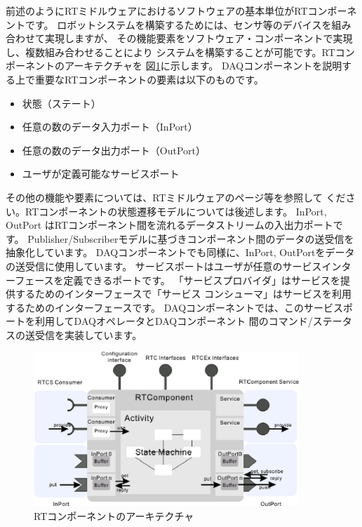 \documentclass[a4j,10pt,dvips,onecolumn,oneside,final]{jarticle}%
\begin{document}
前述のようにRTミドルウェアにおけるソフトウェアの基本単位がRTコンポーネントです。
ロボットシステムを構築するためには、センサ等のデバイスを組み合わせて実現しますが、
その機能要素をソフトウェア・コンポーネントで実現し、複数組み合わせることにより
システムを構築することが可能です。RTコンポーネントのアーキテクチャを
図\ref{RT-component.fig}に示します。
DAQコンポーネントを説明する上で重要なRTコンポーネントの要素は以下のものです。
\begin{itemize}
\item 状態（ステート）
\item 任意の数のデータ入力ポート（InPort）
\item 任意の数のデータ出力ポート（OutPort）
\item ユーザが定義可能なサービスポート
\end{itemize}
その他の機能や要素については、RTミドルウェアのページ等\cite{RTM, RTM-book}を参照して
ください。RTコンポーネントの状態遷移モデルについては後述します。
InPort,  OutPort はRTコンポーネント間を流れるデータストリームの入出力ポートです。
Publisher/Subscriberモデルに基づきコンポーネント間のデータの送受信を抽象化しています。
DAQコンポーネントでも同様に、InPort,  OutPortをデータの送受信に使用しています。
サービスポートはユーザが任意のサービスインターフェースを定義できるポートです。
「サービスプロバイダ」はサービスを提供するためのインターフェースで「サービス
コンシューマ」はサービスを利用するためのインターフェースです。
DAQコンポーネントでは、このサービスポートを利用してDAQオペレータとDAQコンポーネント
間のコマンド/ステータスの送受信を実装しています。
\begin{figure}[htbp]
 \begin{center}
  \includegraphics[width=100mm]{RT-component.eps}
  \caption{RTコンポーネントのアーキテクチャ}
  \label{RT-component.fig}
 \end{center}
\end{figure}
\end{document}
